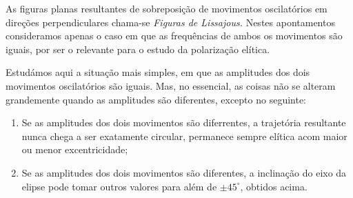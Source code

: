 As figuras planas resultantes de sobreposição de movimentos oscilatórios em
direções perpendiculares chama-se \emph{Figuras de Lissajous.} Nestes
apontamentos consideramos apenas o caso em que as frequências de ambos os
movimentos são iguais, por ser o relevante para o estudo da polarização elítica.

Estudámos aqui a situação mais simples, em que as amplitudes dos dois movimentos
oscilatórios são iguais. Mas, no essencial, as coisas não se alteram grandemente
quando as amplitudes são diferentes, excepto no seguinte:
\begin{enumerate}
\item
  Se as amplitudes dos dois movimentos são diferrentes, a trajetória resultante
  nunca chega a ser exatamente circular, permanece sempre elítica acom maior ou
  menor excentricidade;
\item
  Se as amplitudes dos dois movimentos são diferentes, a inclinação do eixo da
  elipse pode tomar outros valores para além de $\pm45^\circ$, obtidos acima.
\end{enumerate}
